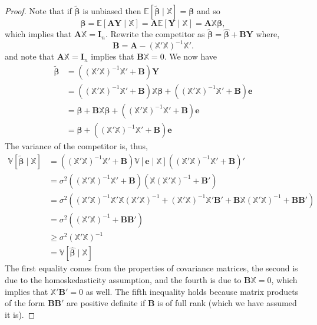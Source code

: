 \documentclass[
  13pt,
  letterpaper,
  DIV=11,
  numbers=noendperiod]{scrreprt}
\newcommand{\mb}{\symbf}
\newcommand{\E}{\mathbb{E}}
\newcommand{\V}{\mathbb{V}}
\newcommand{\Xmat}{\mathbb{X}}
\newcommand{\bfbeta}{\mb{\beta}}
\newcommand{\bhat}{\widehat{\mb{\beta}}}
\theoremstyle{definition}
\theoremstyle{definition}
\theoremstyle{plain}
\theoremstyle{remark}
\begin{document}
\begin{proof}
Note that if \(\widetilde{\bfbeta}\) is unbiased then
\(\E[\widetilde{\bfbeta} \mid \Xmat] = \bfbeta\) and so \[
\bfbeta = \E[\mb{AY} \mid \Xmat] = \mb{A}\E[\mb{Y} \mid \Xmat] = \mb{A}\Xmat\bfbeta,
\] which implies that \(\mb{A}\Xmat = \mb{I}_n\). Rewrite the competitor
as \(\widetilde{\bfbeta} = \bhat + \mb{BY}\) where, \[ 
\mb{B} = \mb{A} - \left(\Xmat'\Xmat\right)^{-1}\Xmat'.
\] and note that \(\mb{A}\Xmat = \mb{I}_n\) implies that
\(\mb{B}\Xmat = 0\). We now have \[ 
\begin{aligned}
  \widetilde{\bfbeta} &= \left( \left(\Xmat'\Xmat\right)^{-1}\Xmat' + \mb{B}\right)\mb{Y} \\
                      &= \left( \left(\Xmat'\Xmat\right)^{-1}\Xmat' + \mb{B}\right)\Xmat\bfbeta + \left( \left(\Xmat'\Xmat\right)^{-1}\Xmat' + \mb{B}\right)\mb{e} \\
                      &= \bfbeta + \mb{B}\Xmat\bfbeta + \left( \left(\Xmat'\Xmat\right)^{-1}\Xmat' + \mb{B}\right)\mb{e} \\
  &= \bfbeta + \left( \left(\Xmat'\Xmat\right)^{-1}\Xmat' + \mb{B}\right)\mb{e}
\end{aligned}
\] The variance of the competitor is, thus, \[ 
\begin{aligned}
  \V[\widetilde{\bfbeta} \mid \Xmat]
  &= \left( \left(\Xmat'\Xmat\right)^{-1}\Xmat' + \mb{B}\right)\V[\mb{e}\mid \Xmat]\left( \left(\Xmat'\Xmat\right)^{-1}\Xmat' + \mb{B}\right)' \\
  &= \sigma^{2}\left( \left(\Xmat'\Xmat\right)^{-1}\Xmat' + \mb{B}\right)\left( \Xmat\left(\Xmat'\Xmat\right)^{-1} + \mb{B}'\right) \\
  &= \sigma^{2}\left(\left(\Xmat'\Xmat\right)^{-1}\Xmat'\Xmat\left(\Xmat'\Xmat\right)^{-1} + \left(\Xmat'\Xmat\right)^{-1}\Xmat'\mb{B}' + \mb{B}\Xmat\left(\Xmat'\Xmat\right)^{-1} + \mb{BB}'\right)\\
  &= \sigma^{2}\left(\left(\Xmat'\Xmat\right)^{-1} + \mb{BB}'\right)\\
  &\geq \sigma^{2}\left(\Xmat'\Xmat\right)^{-1} \\
  &= \V[\bhat \mid \Xmat]
\end{aligned}
\] The first equality comes from the properties of covariance matrices,
the second is due to the homoskedasticity assumption, and the fourth is
due to \(\mb{B}\Xmat = 0\), which implies that \(\Xmat'\mb{B}' = 0\) as
well. The fifth inequality holds because matrix products of the form
\(\mb{BB}'\) are positive definite if \(\mb{B}\) is of full rank (which
we have assumed it is).
\end{proof}
\end{document}
